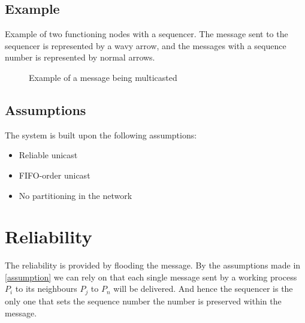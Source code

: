 \documentclass{article}
\begin{document}
 \subsection{Example}
 Example of two functioning nodes with a sequencer. The message sent to the sequencer is 
 represented by a wavy arrow, and the messages with a sequence number is represented by normal
 arrows.
  \begin{figure}[h]
    \centering
    \caption{Example of a message being multicasted}
    \label{fig1}
  \end{figure}
  
  \subsection{Assumptions}
  The system is built upon the following assumptions:
  \label{assumption}
  \begin{itemize}
  \item Reliable unicast
  \item FIFO-order unicast
  \item No partitioning in the network
  \end{itemize}  

\section{Reliability}
  \label{reliability}
  The reliability is provided by flooding the message. By the assumptions made in \ref{assumption} we can rely on 
  that each single message sent by a working process $P_i$ to its neighbours $P_j$ to $P_n$ will be delivered.
  And hence the sequencer is the only one that sets the sequence number the number is preserved within the message.
  
\end{document}
